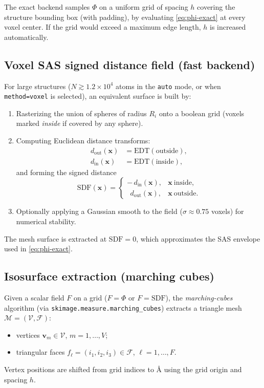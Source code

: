 \documentclass[11pt,a4paper]{article}
\begin{document}
The exact backend samples $\Phi$ on a uniform grid of spacing $h$ covering the
structure bounding box (with padding), by evaluating \eqref{eq:phi-exact} at every
voxel center. If the grid would exceed a maximum edge length, $h$ is increased
automatically.

\subsection{Voxel SAS signed distance field (fast backend)}

For large structures ($N\gtrsim 1.2\times 10^4$ atoms in the \texttt{auto} mode, or
when \texttt{method=voxel} is selected), an equivalent surface is built by:
\begin{enumerate}
  \item Rasterizing the union of spheres of radius $R_i$ onto a boolean grid
        (voxels marked \emph{inside} if covered by any sphere).
  \item Computing Euclidean distance transforms:
        \begin{align}
          d_{\mathrm{out}}(\mathbf{x}) &= \text{EDT}(\text{outside}), \\
          d_{\mathrm{in}}(\mathbf{x})  &= \text{EDT}(\text{inside}),
        \end{align}
        and forming the signed distance
        \begin{equation}
          \mathrm{SDF}(\mathbf{x}) =
          \begin{cases}
            -\,d_{\mathrm{in}}(\mathbf{x}), & \mathbf{x}\ \text{inside},\\[2pt]
            \ \ d_{\mathrm{out}}(\mathbf{x}), & \mathbf{x}\ \text{outside}.
          \end{cases}
        \end{equation}
  \item Optionally applying a Gaussian smooth to the field ($\sigma\approx 0.75$
        voxels) for numerical stability.
\end{enumerate}
The mesh surface is extracted at $\mathrm{SDF}=0$, which approximates the SAS
envelope used in \eqref{eq:phi-exact}.

\subsection{Isosurface extraction (marching cubes)}

Given a scalar field $F$ on a grid ($F=\Phi$ or $F=\mathrm{SDF}$), the
\emph{marching-cubes} algorithm (via \texttt{skimage.measure.marching\_cubes})
extracts a triangle mesh $\mathcal{M}=(\mathcal{V},\mathcal{F})$:
\begin{itemize}
  \item vertices $\mathbf{v}_m\in\mathcal{V}$, $m=1,\ldots,V$;
  \item triangular faces $f_\ell=(i_1,i_2,i_3)\in\mathcal{F}$, $\ell=1,\ldots,F$.
\end{itemize}
Vertex positions are shifted from grid indices to {\AA} using the grid origin and
spacing $h$.
\end{document}
